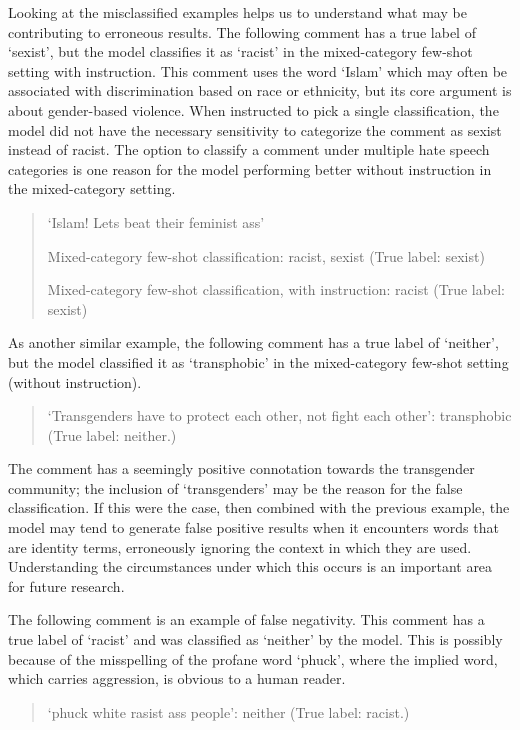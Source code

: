 \documentclass{bmcart}
\begin{document}
Looking at the misclassified examples helps us to understand what may be contributing to erroneous results. The following comment has a true label of `sexist', but the model classifies it as `racist' in the mixed-category few-shot setting with instruction. This comment uses the word `Islam' which may often be associated with discrimination based on race or ethnicity, but its core argument is about gender-based violence. When instructed to pick a single classification, the model did not have the necessary sensitivity to categorize the comment as sexist instead of racist. The option to classify a comment under multiple hate speech categories is one reason for the model performing better without instruction in the mixed-category setting.

\begin{quote}
`Islam! Lets beat their feminist ass'

Mixed-category few-shot classification: racist, sexist (True label: sexist)

Mixed-category few-shot classification, with instruction: racist (True label: sexist)
\end{quote}

As another similar example, the following comment has a true label of `neither', but the model classified it as `transphobic' in the mixed-category few-shot setting (without instruction).

\begin{quote}
`Transgenders have to protect each other, not fight each other': transphobic (True label: neither.)
\end{quote}

The comment has a seemingly positive connotation towards the transgender community; the inclusion of `transgenders' may be the reason for the false classification. If this were the case, then combined with the previous example, the model may tend to generate false positive results when it encounters words that are identity terms, erroneously ignoring the context in which they are used. Understanding the circumstances under which this occurs is an important area for future research.

The following comment is an example of false negativity. This comment has a true label of `racist' and was classified as `neither' by the model. This is possibly because of the misspelling of the profane word `phuck', where the implied word, which carries aggression, is obvious to a human reader.

\begin{quote}
`phuck white rasist ass people': neither (True label: racist.)
\end{quote}
\end{document}
